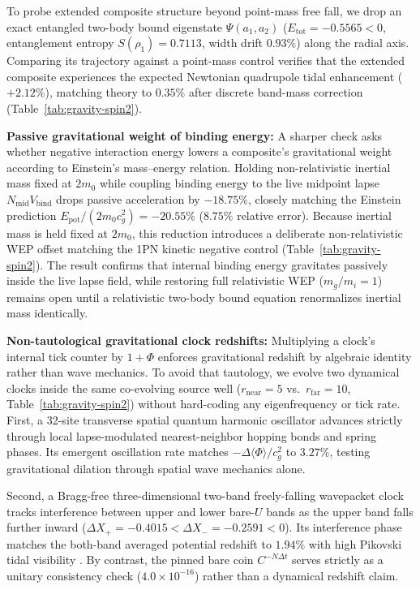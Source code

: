 To probe extended composite structure beyond point-mass free fall, we drop an exact entangled two-body bound eigenstate
$\Psi(a_1, a_2)$ ($E_{\mathrm{tot}} = -0.5565 < 0$, entanglement entropy $S(\rho_1) = 0.7113$, width drift $0.93\%$)
along the radial axis. Comparing its trajectory against a point-mass control verifies that the extended composite
experiences the expected Newtonian quadrupole tidal enhancement ($+2.12\%$), matching theory to $0.35\%$ after discrete
band-mass correction (Table~\ref{tab:gravity-spin2}).

\textbf{Passive gravitational weight of binding energy:} A sharper check asks whether negative interaction energy lowers
a composite's gravitational weight according to Einstein's mass--energy relation. Holding non-relativistic inertial mass
fixed at $2 m_0$ while coupling binding energy to the live midpoint lapse $N_{\mathrm{mid}} V_{\mathrm{bind}}$ drops
passive acceleration by $-18.75\%$, closely matching the Einstein prediction $E_{\mathrm{pot}}/(2 m_0 c_g^2) =
-20.55\%$ ($8.75\%$ relative error). Because inertial mass is held fixed at $2 m_0$, this reduction introduces a
deliberate non-relativistic WEP offset matching the 1PN kinetic negative control (Table~\ref{tab:gravity-spin2}). The
result confirms that internal binding energy gravitates passively inside the live lapse field, while restoring full
relativistic WEP ($m_g / m_i = 1$) remains open until a relativistic two-body bound equation renormalizes inertial mass
identically.

\textbf{Non-tautological gravitational clock redshifts:} Multiplying a clock's internal tick counter by $1 + \Phi$
enforces gravitational redshift by algebraic identity rather than wave mechanics. To avoid that tautology, we evolve
two dynamical clocks inside the same co-evolving source well ($r_{\mathrm{near}} = 5$ vs.\ $r_{\mathrm{far}} = 10$,
Table~\ref{tab:gravity-spin2}) without hard-coding any eigenfrequency or tick rate. First, a 32-site transverse spatial
quantum harmonic oscillator advances strictly through local lapse-modulated nearest-neighbor hopping bonds and spring
phases. Its emergent oscillation rate matches $-\Delta\langle\Phi\rangle/c_g^2$ to $3.27\%$, testing gravitational
dilation through spatial wave mechanics alone.

Second, a Bragg-free three-dimensional two-band freely-falling wavepacket clock tracks interference between upper and
lower bare-$U$ bands as the upper band falls further inward ($\Delta X_+ = -0.4015 < \Delta X_- = -0.2591 < 0$). Its
interference phase matches the both-band averaged potential redshift to $1.94\%$ with high Pikovski tidal visibility
\cite{pikovski2015}. By contrast, the pinned bare coin $C^{-N\Delta t}$ serves strictly as a unitary consistency check
($4.0 \times 10^{-16}$) rather than a dynamical redshift claim.

